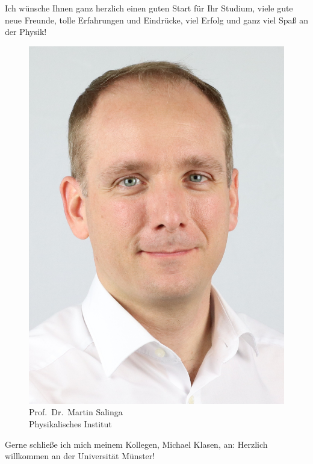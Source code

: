 \begin{multicols}{2}
Ich wünsche Ihnen ganz herzlich einen guten Start für Ihr Studium, viele gute neue Freunde, tolle Erfahrungen und Eindrücke, viel Erfolg und ganz viel Spaß an der Physik!


\newpage

\begin{multicols}{2}

\begin{figure}
	\centering
\includegraphics[width=0.8\columnwidth, height=0.25\textheight]{res/vorstellungsfotos/Foto_Salinga.jpg}
	\caption*{\centering Prof.\ Dr.\ Martin Salinga \\ Physikalisches Institut}
\end{figure}

Gerne schließe ich mich meinem Kollegen, Michael Klasen, an: Herzlich willkommen an der Universität Münster! 


\end{multicols}
\end{multicols}
